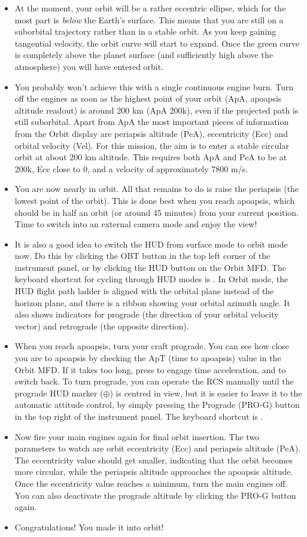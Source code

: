 \documentclass[Orbiter User Manual.tex]{subfiles}
\begin{document}
\begin{itemize}
\item At the moment, your orbit will be a rather eccentric ellipse, which for the most part is \textit{below} the Earth's surface. This means that you are still on a suborbital trajectory rather than in a stable orbit. As you keep gaining tangential velocity, the orbit curve will start to expand. Once the green curve is completely above the planet surface (and sufficiently high above the atmosphere) you will have entered orbit. 
\item You probably won't achieve this with a single continuous engine burn. Turn off the engines as soon as the highest point of your orbit (ApA, apoapsis altitude readout) is around 200 km (ApA 200k), even if the projected path is still suborbital. Apart from ApA the most important pieces of information from the Orbit display are periapsis altitude (PeA), eccentricity (Ecc) and orbital velocity (Vel). For this mission, the aim is to enter a stable circular orbit at about 200 km altitude. This requires both ApA and PeA to be at 200k, Ecc close to 0, and a velocity of approximately 7800 m/s.
\item You are now nearly in orbit. All that remains to do is raise the periapsis (the lowest point of the orbit). This is done best when you reach apoapsis, which should be in half an orbit (or around 45 minutes) from your current position. Time to switch into an external camera mode and enjoy the view!
\item It is also a good idea to switch the HUD from surface mode to orbit mode now. Do this by clicking the OBT button in the top left corner of the instrument panel, or by clicking the HUD button on the Orbit MFD. The keyboard shortcut for cycling through HUD modes is . In Orbit mode, the HUD flight path ladder is aligned with the orbital plane instead of the horizon plane, and there is a ribbon showing your orbital azimuth angle. It also shows indicators for prograde (the direction of your orbital velocity vector) and retrograde (the opposite direction).
\item When you reach apoapsis, turn your craft prograde. You can see how close you are to apoapsis by checking the ApT (time to apoapsis) value in the Orbit MFD. If it takes too long, press  to engage time acceleration, and  to switch back. To turn prograde, you can operate the RCS manually until the prograde HUD marker ($\oplus$) is centred in view, but it is easier to leave it to the automatic attitude control, by simply pressing the Prograde (PRO-G) button in the top right of the instrument panel. The keyboard shortcut is \keystroke{[}.
\item Now fire your main engines again for final orbit insertion. The two parameters to watch are orbit eccentricity (Ecc) and periapsis altitude (PeA). The eccentricity value should get smaller, indicating that the orbit becomes more circular, while the periapsis altitude approaches the apoapsis altitude. Once the eccentricity value reaches a minimum, turn the main engines off. You can also deactivate the prograde altitude by clicking the PRO-G button again.
\item Congratulations! You made it into orbit!
\end{itemize}
\end{document}
